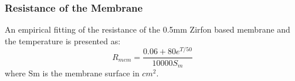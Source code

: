 \documentclass[11pt, a4paper]{article}
\begin{document}



\subsubsection{Resistance of the Membrane}
An empirical fitting of the resistance of the 0.5mm Zirfon based membrane and the temperature is presented as:\cite{activation4}
\begin{equation}
R_{mem} = \frac{0.06+80e^{T/50}}{10000S_m}
\end{equation}
where Sm is the membrane surface in $cm^2$.
\end{document}
